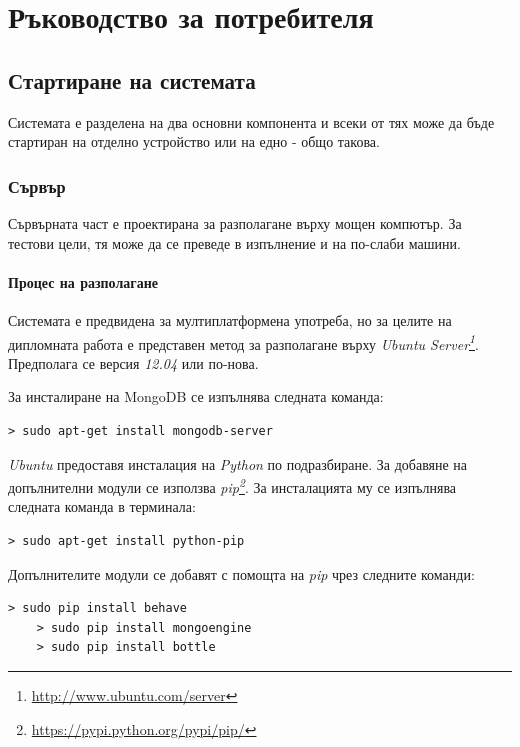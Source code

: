 \chapter{Ръководство за потребителя}

	\section{Стартиране на системата}
	
	Системата е разделена на два основни компонента и всеки от тях може да бъде стартиран на отделно устройство или на едно - общо такова.
	
	\subsection{Сървър}
	
	Сървърната част е проектирана за разполагане върху мощен компютър. За тестови цели, тя може да се преведе в изпълнение и на по-слаби машини.
	
	\subsubsection{Процес на разполагане}
	
	Системата е предвидена за мултиплатформена употреба, но за целите на дипломната работа е представен метод за разполагане върху \emph{Ubuntu Server\footnote{\url{http://www.ubuntu.com/server}}}. Предполага се версия \emph{12.04} или по-нова.
	
	За инсталиране на MongoDB се изпълнява следната команда:
	\begin{lstlisting}[style=BashStyle]
    > sudo apt-get install mongodb-server
	\end{lstlisting}
	
	\emph{Ubuntu} предоставя инсталация на \emph{Python} по подразбиране. За добавяне на допълнителни модули се използва \emph{pip\footnote{\url{https://pypi.python.org/pypi/pip/}}}. За инсталацията му се изпълнява следната команда в терминала:
	\begin{lstlisting}[style=BashStyle]
    > sudo apt-get install python-pip
	\end{lstlisting}

	Допълнителите модули се добавят с помощта на \emph{pip} чрез следните команди:
	\begin{lstlisting}[style=BashStyle]
    > sudo pip install behave
    > sudo pip install mongoengine
    > sudo pip install bottle
	\end{lstlisting}

